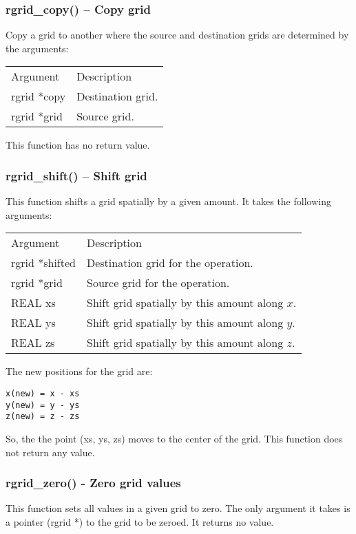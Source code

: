 \documentclass[12pt,letterpaper]{article}
\begin{document}
\subsubsection{rgrid\_copy() -- Copy grid}

Copy a grid to another where the source and destination grids are determined by the arguments:
\begin{longtable}{p{} p{}}
Argument & Description\\
\cline{1-2}
rgrid *copy & Destination grid.\\
rgrid *grid & Source grid.\\
\end{longtable}
\noindent
This function has no return value.

\subsubsection{rgrid\_shift() -- Shift grid}

This function shifts a grid spatially by a given amount. It takes the following arguments:
\begin{longtable}{p{} p{}}
Argument & Description\\
\cline{1-2}
rgrid *shifted & Destination grid for the operation.\\
rgrid *grid & Source grid for the operation.\\
REAL xs & Shift grid spatially by this amount along $x$.\\
REAL ys & Shift grid spatially by this amount along $y$.\\
REAL zs & Shift grid spatially by this amount along $z$.\\
\end{longtable}
\noindent
The new positions for the grid are:
\begin{verbatim}
x(new) = x - xs 
y(new) = y - ys 
z(new) = z - zs
\end{verbatim}
\noindent
So, the the point (xs, ys, zs) moves to the center of the grid. This function does not return any value.

\subsubsection{rgrid\_zero() - Zero grid values}

This function sets all values in a given grid to zero. The only argument it takes is a pointer (rgrid *) to the grid to be zeroed. It returns no value.
\end{document}
